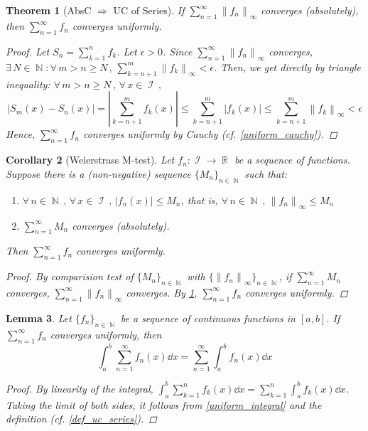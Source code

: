 \documentclass[12pt]{article}
\let\RA\Rightarrow
\let\ee\epsilon
\newcommand{\Forall}[1]{\forall\,{#1}\,,\,}
\newcommand{\Exist}[1]{\exists\,{#1}:}
\DeclareMathOperator{\R}{\mathbb{R}}
\DeclareMathOperator{\N}{\mathbb{N}}
\DeclareMathOperator{\I}{\mathcal{I}}
\newcommand{\seq}[2]{\{{#1}\}_{#2\in\N}}
\newcommand{\fsup}[1]{\left\|#1\right\|_\infty}
\newtheorem{theorem}{Theorem}[subsection]
\newtheorem{lemma}[theorem]{Lemma}
\newtheorem{corollary}[theorem]{Corollary}
\begin{document}
\begin{theorem}[AbsC $\RA$ UC of Series]
  \label{absc_implies_uc}
  If $\sum_{n=1}^\infty\fsup{f_n}$ converges (absolutely), then $\sum_{n=1}^\infty f_n$ converges uniformly.
  \begin{proof}
    Let $S_n=\sum_{k=1}^n f_k$. Let $\ee>0$. Since $\sum_{n=1}^\infty \fsup{f_n}$ converges, $\Exist{N\in\N}\Forall{m>n\geq N} \sum_{k=n+1}^m \fsup{f_k}<\ee$. Then, we get directly by triangle inequality: $\Forall{m>n\geq N}\Forall{x\in\I}$ $$|S_m(x)-S_n(x)|=\left|\sum_{k=n+1}^m f_k(x)\right|\leq \sum_{k=n+1}^m |f_k(x)|\leq \sum_{k=n+1}^m \fsup{f_k}<\ee$$ Hence, $\sum_{n=1}^\infty f_n$ converges uniformly by Cauchy (cf. \ref{uniform_cauchy}).
  \end{proof}
\end{theorem}

\begin{corollary}[Weierstrass M-test]
  \label{mtest}
  Let $f_n:\I\to\R$ be a sequence of functions. Suppose there is a (non-negative) sequence $\seq{M_n}{n}$ such that:
  \begin{enumerate}
    \item $\Forall{n\in\N}\Forall{x\in\I} |f_n(x)|\leq M_n$, that is, $\Forall{n\in\N}\fsup{f_n}\leq M_n$
    \item $\sum_{n=1}^\infty M_n$ converges (absolutely).
  \end{enumerate} 
  Then $\sum_{n=1}^\infty f_n$ converges uniformly.
  \begin{proof}
    By comparision test of $\seq{M_n}{n}$ with $\seq{\fsup{f_n}}{n}$, if $\sum_{n=1}^\infty M_n$ converges, $\sum_{n=1}^\infty\fsup{f_n}$ converges. By \ref{absc_implies_uc}, $\sum_{n=1}^\infty f_n$ converges uniformly.
  \end{proof}
\end{corollary}

\begin{lemma}
  Let $\seq{f_n}{n}$ be a sequence of continuous functions in $[a,b]$. If $\sum_{n=1}^\infty f_n$ converges uniformly, then $$\int_a^b\sum_{n=1}^\infty f_n(x)\dd{x}=\sum_{n=1}^\infty\int_a^b f_n(x)\dd{x}$$
  \begin{proof}
    By linearity of the integral, $\int_a^b\sum_{k=1}^n f_k(x)\dd{x}=\sum_{k=1}^n\int_a^b f_k(x)\dd{x}$. Taking the limit of both sides, it follows from \ref{uniform_integral} and the definition (cf. \ref{def_uc_series}).
  \end{proof}
\end{lemma}
\end{document}
